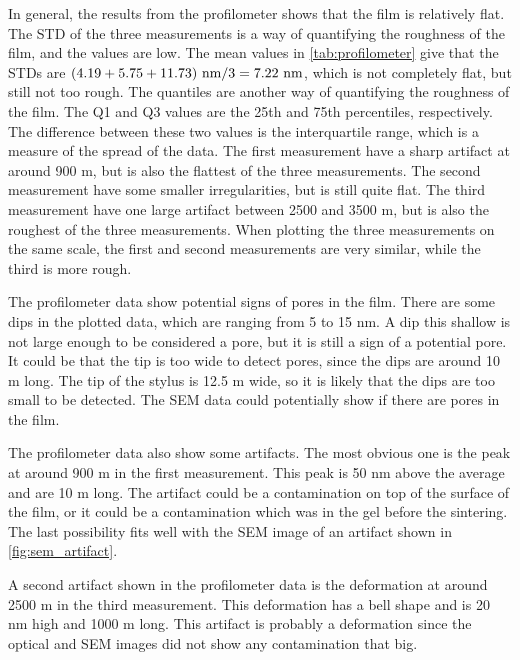 \noindent In general, the results from the profilometer shows that the film is relatively flat.
The STD of the three measurements is a way of quantifying the roughness of the film, and the values are low.
The mean values in \autoref{tab:profilometer} give that the STDs are $(4.19 + 5.75 + 11.73) \textnormal{ nm} / 3  = 7.22 \textnormal{ nm}$, which is not completely flat, but still not too rough. %
The quantiles are another way of quantifying the roughness of the film.
The Q1 and Q3 values are the 25th and 75th percentiles, respectively.
The difference between these two values is the interquartile range, which is a measure of the spread of the data.
The first measurement have a sharp artifact at around 900 \textmu m, but is also the flattest of the three measurements.
The second measurement have some smaller irregularities, but is still quite flat.
The third measurement have one large artifact between 2500 and 3500 \textmu m, but is also the roughest of the three measurements.
When plotting the three measurements on the same scale, the first and second measurements are very similar, while the third is more rough.

The profilometer data show potential signs of pores in the film.
There are some dips in the plotted data, which are ranging from 5 to 15 nm.
A dip this shallow is not large enough to be considered a pore, but it is still a sign of a potential pore.
It could be that the tip is too wide to detect pores, since the dips are around 10 \textmu m long.
The tip of the stylus is 12.5 \textmu m wide, so it is likely that the dips are too small to be detected.
The SEM data could potentially show if there are pores in the film.

The profilometer data also show some artifacts.
The most obvious one is the peak at around 900 \textmu m in the first measurement.
This peak is 50 nm above the average and are 10 \textmu m long.
The artifact could be a contamination on top of the surface of the film, or it could be a contamination which was in the gel before the sintering.
The last possibility fits well with the SEM image of an artifact shown in \autoref{fig:sem_artifact}.

A second artifact shown in the profilometer data is the deformation at around 2500 \textmu m in the third measurement.
This deformation has a bell shape and is 20 nm high and 1000 \textmu m long.
This artifact is probably a deformation since the optical and SEM images did not show any contamination that big.


